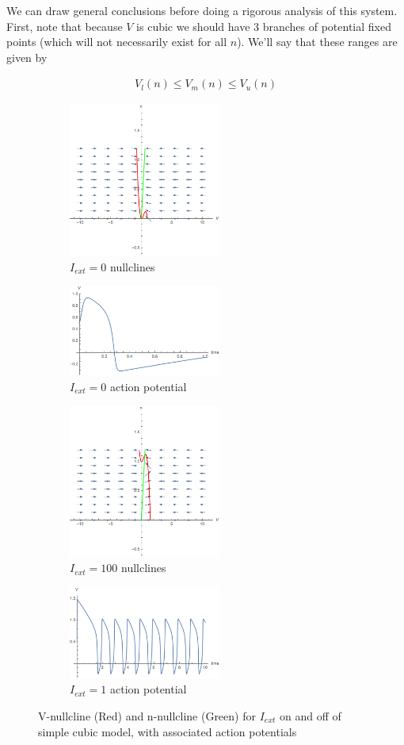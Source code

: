 \documentclass{article}
\begin{document}
We can draw general conclusions before doing a rigorous analysis of this system. First, note that because $V$ is cubic we should have 3 branches of potential fixed points (which will not necessarily exist for all $n$). We'll say that these ranges are given by 

\begin{align*}
    V_l(n) \leq V_m(n) \leq V_u(n)
\end{align*}

\begin{figure}
\centering
\begin{subfigure}{.5\textwidth}
	\centering
	\includegraphics[width=5cm]{nullc_naguro.png}
	\caption{$I_{ext}=0$ nullclines}
\end{subfigure}%
\begin{subfigure}{.5\textwidth}
	\centering
	\includegraphics[width=5cm]{nagumo_ap.png}
	\caption{$I_{ext}=0$ action potential}
\end{subfigure}
\begin{subfigure}{.5\textwidth}
	\centering
	\includegraphics[width=5cm]{sustained_nagumo_nullc.png}
	\caption{$I_{ext}=100$ nullclines}
\end{subfigure}%
\begin{subfigure}{.5\textwidth}
	\centering
	\includegraphics[width=5cm]{sustained_nagumo.png}
	\caption{$I_{ext}=1$ action potential}
\end{subfigure}
	\caption{V-nullcline (Red) and n-nullcline (Green) for $I_{ext}$ on and off of simple cubic model, with associated action potentials}
	\label{fig:nullc}
\end{figure}
\end{document}
